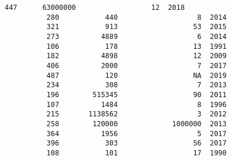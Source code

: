 \documentclass[11pt]{article}
\begin{document}
\begin{Verbatim}[commandchars=\\\{\}]
          447      63000000                  12  2018   
          280           440                   8  2014   
          321           913                  53  2015   
          273          4889                   6  2014   
          106           178                  13  1991   
          182          4898                  12  2009   
          406          2000                   7  2017   
          487           120                  NA  2019   
          234           308                   7  2013   
          196        515345                  90  2011   
          107          1484                   8  1996   
          215       1138562                   3  2012   
          258        120000             1000000  2013   
          364          1956                   5  2017   
          396           303                  56  2017   
          108           101                  17  1990   
          

\end{Verbatim}
\end{document}
